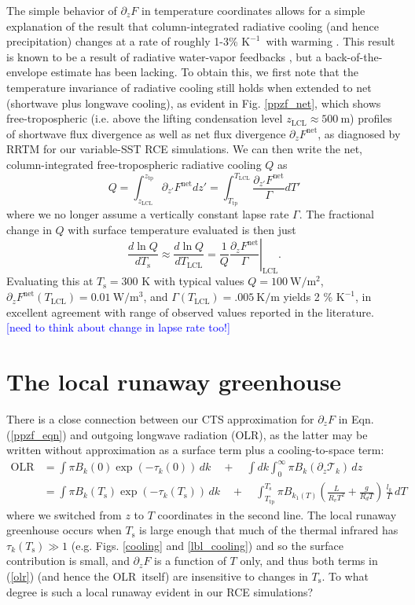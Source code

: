 \documentclass[10pt]{article}
\newcommand{\comment}[1]{\textcolor{blue}{[{#1}]}}
\newcommand{\beqn}{\begin{equation}}
\newcommand{\eeqn}{\end{equation}}
\newcommand{\eqnref}[1]{(\ref{#1})}
\newcommand{\n}{\nonumber}
\newcommand{\der}[2]{\ensuremath{\frac{d #1}{d #2}}}
\newcommand{\ppz}{\ensuremath{\partial_z}}
\newcommand{\Fnet}{\ensuremath{F^\mathrm{net}}}
\newcommand{\OLR}{\ensuremath{\mathrm{OLR}}}
\newcommand{\trans}{\ensuremath{\mathcal{T}}}
\newcommand{\Ts}{\ensuremath{T_\mathrm{s}}}
\newcommand{\ztp}{\ensuremath{z_\mathrm{tp}}}
\newcommand{\zlcl}{\ensuremath{z_\mathrm{LCL}}}
\newcommand{\Tlcl}{\ensuremath{T_\mathrm{LCL}}}
\newcommand{\Ttp}{\ensuremath{T_\mathrm{tp}}}
\newcommand{\Kinverse}{\ensuremath{\mathrm{K^{-1}}}}
\begin{document}
The simple behavior of $\ppz F$ in temperature coordinates allows for a simple explanation of the result that column-integrated radiative cooling (and hence precipitation) changes at a rate of roughly 1-3\% \Kinverse\ with warming \citep{ogorman2012}. This result is known to be a result of radiative water-vapor feedbacks \citep{pendergrass2014}, but a back-of-the-envelope estimate has been lacking. To obtain this, we first note that the temperature invariance of radiative cooling still holds when extended to net (shortwave plus longwave cooling), as evident in Fig. \ref{ppzf_net}, which  shows free-tropospheric (i.e. above the lifting condensation level $\zlcl  \approx 500\ \mathrm{m}$) profiles of shortwave flux divergence  as well as net flux divergence $\ppz \Fnet$, as diagnosed by RRTM for our variable-SST RCE simulations. We can then write the net, column-integrated free-tropospheric radiative cooling $Q$ as 
	\beqn
		Q = \int_{\zlcl}^{\ztp} \partial_{z'} \Fnet dz'  = \int_{\Ttp}^{\Tlcl} \frac{\partial_{z'} \Fnet}{\Gamma} dT' \n
	\eeqn
where we no longer assume a vertically constant lapse rate $\Gamma$.  The fractional change in $Q$ with surface temperature evaluated  is then just
	\beqn
		\der{\ln Q}{\Ts}	\approx \der{\ln Q}{\Tlcl} = \frac{1}{Q} \left. \frac{\ppz \Fnet}{\Gamma}\right |_{\mathrm{LCL}}.   \n
	\eeqn
Evaluating this at $\Ts=300$ K with typical values $Q=100 \ \mathrm{W/m^2}$, $\ppz \Fnet(\Tlcl)=0.01 \ \mathrm{W/m^3}$, and $\Gamma(\Tlcl) = .005\ \mathrm{K/m}$ yields 2 \% \Kinverse, in excellent agreement with range of observed values reported in the literature. \comment{need to think about change in lapse rate too!}


\section{The local runaway greenhouse} 
There is a close connection between our CTS approximation for  $\ppz F$ in Eqn. \eqnref{ppzf_eqn} and outgoing longwave radiation (OLR), as the latter may be written without approximation as a surface term plus a cooling-to-space term:
	\begin{align}
		\OLR   & = \int \pi B_k(0)\exp(-\tau_k(0))\, dk \quad + \quad \int dk \int_0^\infty \pi B_k(\partial_{z} \trans_k ) \, dz \;    \n  \\
			   &  = \int \pi  B_k(\Ts)\exp(-\tau_k(\Ts))\, dk \quad + 
			   		\quad \int_{\Ttp}^{\Ts} \pi B_{k_1(T)}\left(\frac{L }{R_vT^{2}}+\frac{g}{R_d T} \right)\, \frac{l_k}{\Gamma}\, dT  	
				   \label{olr}
	\end{align}
where we switched from $z$ to $T$ coordinates in the second line. The local runaway greenhouse \citep{pierrehumbert1995} occurs when $\Ts$ is large enough that  much of the thermal infrared has $\tau_k(\Ts) \gg 1$ (e.g. Figs. \ref{cooling} and  \ref{lbl_cooling}) and so the surface contribution is small, and $\ppz F$ is a function of $T$ only, and thus both terms in \eqnref{olr} (and hence the \OLR\ itself) are insensitive to changes in \Ts. To what degree is such a local runaway evident in our RCE simulations?
\end{document}
